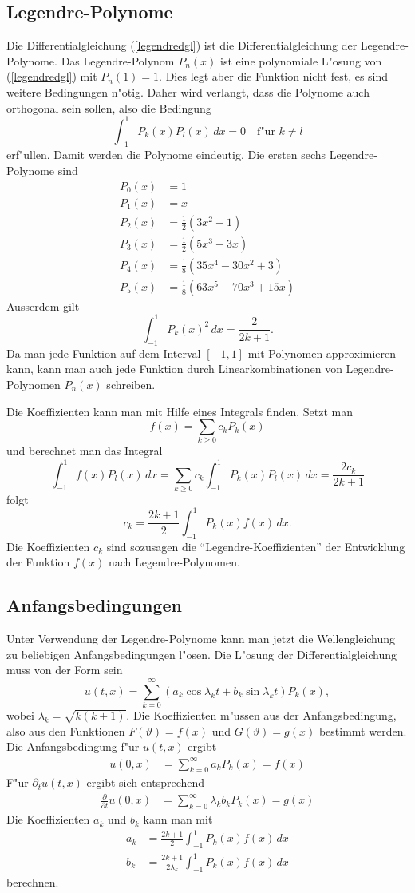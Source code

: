 \subsection{Legendre-Polynome}
Die Differentialgleichung (\ref{legendredgl}) ist die Differentialgleichung
der Legendre-Polynome.
Das Legendre-Polynom $P_n(x)$ ist eine polynomiale L"osung von
(\ref{legendredgl}) mit $P_n(1)=1$.
Dies legt aber die Funktion nicht fest, es sind weitere Bedingungen
n"otig. Daher wird verlangt, dass die Polynome auch orthogonal
sein sollen, also die Bedingung
$$
\int_{-1}^1 P_k(x)P_l(x)\,dx=0\quad\text{f"ur $k\ne l$}
$$
erf"ullen. Damit werden die Polynome eindeutig.
Die ersten sechs Legendre-Polynome sind
\begin{align*}
P_0(x)&=1\\
P_1(x)&=x\\
P_2(x)&=\frac12(3x^2-1)\\
P_3(x)&=\frac12(5x^3-3x)\\
P_4(x)&=\frac18(35x^4-30x^2+3)\\
P_5(x)&=\frac18(63x^5-70x^3+15x)
\end{align*}
Ausserdem gilt
$$
\int_{-1}^1 P_k(x)^2\,dx = \frac{2}{2k+1}.
$$
Da man 
jede Funktion auf dem Interval $[-1,1]$ mit Polynomen approximieren kann,
kann man auch jede Funktion durch Linearkombinationen von Legendre-Polynomen
$P_n(x)$ schreiben. 

Die Koeffizienten kann man mit Hilfe eines Integrals finden. Setzt man
$$
f(x)=\sum_{k\ge 0} c_k P_k(x)
$$
und berechnet man das Integral
$$
\int_{-1}^1 f(x)P_l(x)\,dx
=
\sum_{k\ge 0} c_k \int_{-1}^1 P_k(x)P_l(x)\,dx
=
\frac{2c_k}{2k+1}
$$
folgt
$$
c_k=\frac{2k+1}{2}\int_{-1}^1P_k(x)f(x)\,dx.
$$
Die Koeffizienten $c_k$ sind sozusagen die ``Legendre-Koeffizienten''
der Entwicklung der Funktion $f(x)$ nach Legendre-Polynomen.

\subsection{Anfangsbedingungen}
Unter Verwendung der Legendre-Polynome kann man jetzt die Wellengleichung
zu beliebigen Anfangsbedingungen l"osen.
Die L"osung der Differentialgleichung muss von der Form sein
$$
u(t, x)=\sum_{k=0}^{\infty}(a_k\cos \lambda_k t+b_k\sin\lambda_k t)P_k(x),
$$
wobei $\lambda_k=\sqrt{k(k+1)}$.
Die Koeffizienten m"ussen aus der Anfangsbedingung, also aus den 
Funktionen $F(\vartheta)=f(x)$ und $G(\vartheta)=g(x)$ bestimmt werden.
Die Anfangsbedingung f"ur $u(t,x)$ ergibt
\begin{align*}
u(0,x)
&=\sum_{k=0}^{\infty} a_kP_k(x)=f(x)
\end{align*}
F"ur $\partial_tu(t,x)$ ergibt sich entsprechend
\begin{align*}
\frac{\partial}{\partial t}u(0,x)
&=\sum_{k=0}^{\infty} \lambda_k b_kP_k(x)=g(x)
\end{align*}
Die Koeffizienten $a_k$ und $b_k$ kann man mit
\begin{align*}
a_k&=
\frac{2k+1}{2}\int_{-1}^1 P_k(x)f(x)\,dx
\\
b_k&=
\frac{2k+1}{2\lambda_k}\int_{-1}^1P_k(x)f(x)\,dx
\end{align*}
berechnen.

